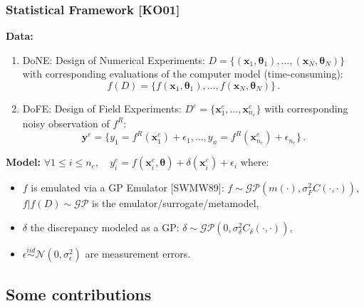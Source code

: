 \documentclass[nopagenumber,9pt]{beamer}
\newcommand{\btheta}{\boldsymbol{\theta}}
\newcommand{\by}{\mathbf{y}}
\newcommand{\bx}{\mathbf{x}}
\newcommand{\bxf}{\bx^e}
\newcommand{\nf}{n_e}
\newcommand{\Df}{D^e}
\newcommand{\yf}{y^e}
\newcommand{\byf}{\by^e}
\newcommand{\citemano}[1]{\textcolor{dgreen}{#1}}
\begin{document}
\begin{frame}
 \frametitle{Statistical Framework \citemano{[KO01]}}

\textbf{Data:}

\begin{enumerate}
 \item DoNE: Design of Numerical Experiments: $D=\{(\bx_1,\btheta_1),\ldots,(\bx_N,\btheta_N)\}$  %
with corresponding evaluations of the computer model (time-consuming):
$$f(D)=\{f(\bx_1,\btheta_1),\ldots,f(\bx_N,\btheta_N)\}\,.$$


 \item DoFE: Design of Field Experiments: $\Df=\{\bxf_1,\ldots,\bxf_{\nf}\}$ with corresponding noisy observation of $f^R$:$$\byf=\{y_1=f^R(\bxf_1)+\epsilon_1,\ldots,y_n=f^R(\bxf_{\nf})+\epsilon_{\nf}\}\,.$$
\end{enumerate}






\smallskip

\textbf{Model:}\quad
$\forall 1\le i \le \nf,\quad \yf_i = f(\bxf_i,\btheta) + \delta(\bxf_i) +\epsilon_i$
where:

\smallskip
\begin{itemize}
 \item $f$ is emulated via a GP Emulator \citemano{[SWMW89]}: $f\sim \mathcal{GP}(m(\cdot),\sigma_F^2C(\cdot,\cdot))$,\\ $f|f(D)\sim \mathcal{GP}$ is the emulator/surrogate/metamodel,
 \item $\delta$ the discrepancy modeled as a GP: $\delta\sim \mathcal{GP}(0,\sigma_\delta^2C_\delta(\cdot,\cdot))$,
 \item $\epsilon\overset{iid}{\sim}\mathcal{N}(0,\sigma_{\epsilon}^2)$ are measurement errors.
\end{itemize}






\end{frame}


\subsection{Some contributions}
\end{document}

